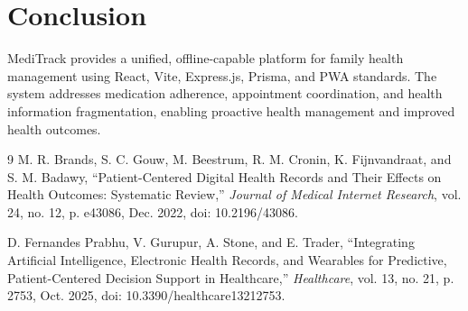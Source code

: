 \documentclass[12pt, a4paper]{report}
\begin{document}
\chapter*{Conclusion}
MediTrack provides a unified, offline-capable platform for family health management using React, Vite, Express.js, Prisma, and PWA standards. The system addresses medication adherence, appointment coordination, and health information fragmentation, enabling proactive health management and improved health outcomes.


\begin{thebibliography}{9}
M. R. Brands, S. C. Gouw, M. Beestrum, R. M. Cronin, K. Fijnvandraat, and S. M. Badawy, ``Patient-Centered Digital Health Records and Their Effects on Health Outcomes: Systematic Review,'' \textit{Journal of Medical Internet Research}, vol. 24, no. 12, p. e43086, Dec. 2022, doi: 10.2196/43086.

D. Fernandes Prabhu, V. Gurupur, A. Stone, and E. Trader, ``Integrating Artificial Intelligence, Electronic Health Records, and Wearables for Predictive, Patient-Centered Decision Support in Healthcare,'' \textit{Healthcare}, vol. 13, no. 21, p. 2753, Oct. 2025, doi: 10.3390/healthcare13212753.
\end{thebibliography}
\end{document}
